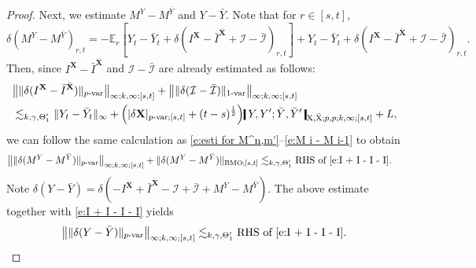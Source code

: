 \documentclass[11pt,reqno]{amsart}
\numberwithin{equation}{section}
\def\E{\mathbb E}
\newcommand{\shortthickbar}{%
  \vcenter{\hbox{\rule{1.8pt}{2.2ex}}}%
}
\newcommand{\thicknm}[1]{%
  \mathopen{\shortthickbar}%
  \mkern4mu #1 \mkern4mu%
  \mathclose{\shortthickbar}%
}
\begin{document}
\begin{proof}
Next, we estimate $M^Y - M^{\bar Y}$ and $Y - \bar Y$. Note that for $r \in [s,t]$,
\begin{equation*}
\delta (M^{Y} - M^{\bar Y})_{r,t} = - \E_{r}\left[Y_t - \bar Y_t + \delta (I^{\mathbf X} - \bar I^{\bar {\mathbf X}} + \mathcal I - \bar{\mathcal I})_{r,t}\right] + Y_t - \bar Y_t + \delta (I^{\mathbf X} - \bar I^{\bar {\mathbf X}} + \mathcal I - \bar{\mathcal I})_{r,t}. 
\end{equation*}
Then, since $I^{\mathbf X} - \bar I^{\bar {\mathbf X}}$ and $\mathcal I - \bar{\mathcal I}$ are already estimated as follows:
\begin{equation}\label{e:I + I - I - I}
\begin{aligned}
&\big\| \|\delta(I^{\mathbf X} - \bar I^{\bar{\mathbf X}})\|_{p\text{-}\mathrm{var}} \big\|_{\infty;k,\infty;[s,t]} + \big\| \|\delta(\mathcal I - \bar{\mathcal I}) \|_{1\text{-}\mathrm{var}} \big\|_{\infty;k,\infty;[s,t]}\\
& \lesssim_{k,\gamma,\Theta'_1} \|Y_t - \bar Y_t\|_{\infty} + \Big(|\delta \mathbf X|_{p\text{-}\mathrm{var};[s,t]} + (t - s)^{\frac{1}{2}}\Big)\thicknm{Y ,Y'; \bar Y, \bar Y'}_{\mathrm X,\bar{\mathrm X};p,p;k,\infty;[s,t]} + L, 
\end{aligned}
\end{equation}
we can follow the same calculation as \eqref{e:esti for M^n,m'}--\eqref{e:M i - M i-1} to obtain  
\begin{equation}\label{e:M - bar M}
\begin{aligned}
&\big\| \|\delta (M^Y - M^{\bar Y})\|_{p\text{-}\mathrm{var}} \big\|_{\infty;k,\infty;[s,t]} + \|\delta (M^Y - M^{\bar Y})\|_{\mathrm{BMO};[s,t]} \lesssim_{k,\gamma,\Theta'_1} \text{RHS of \eqref{e:I + I - I - I}.}
\end{aligned}
\end{equation}
Note $\delta (Y - \bar Y) = \delta (- I^{\mathbf X} + \bar I^{\bar{\mathbf X}} - \mathcal I + \bar{\mathcal I} + M^{Y} - M^{\bar Y})$. The above estimate together with \eqref{e:I + I - I - I} yields 
\begin{equation}\label{e:Y - bar Y}
\big\| \|\delta (Y - \bar Y)\|_{p\text{-}\mathrm{var}} \big\|_{\infty;k,\infty;[s,t]} \lesssim_{k,\gamma,\Theta'_1} \text{RHS of \eqref{e:I + I - I - I}.} 
\end{equation}


\end{proof}
\end{document}
